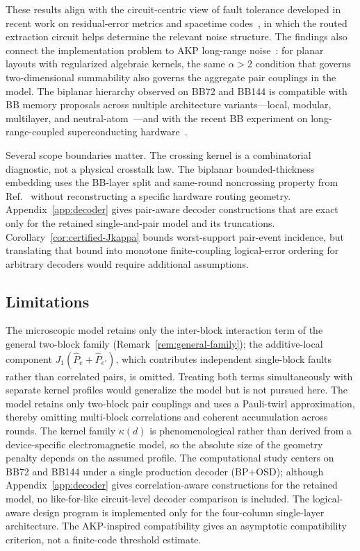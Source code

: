 \documentclass[
aps,
prx,
10pt,
twocolumn,
groupedaddress,
longbibliography,
nofootinbib,
floatfix
]{revtex4-2}
\theoremstyle{definition}
\begin{document}
These results align with the circuit-centric view of fault tolerance developed in recent work on residual-error metrics and spacetime codes~\cite{strikis_sec_2026,aitchison_beri_2025,pesah_spacetime_2025}, in which the routed extraction circuit helps determine the relevant noise structure. The findings also connect the implementation problem to AKP long-range noise~\cite{akp_2006}: for planar layouts with regularized algebraic kernels, the same $\alpha>2$ condition that governs two-dimensional summability also governs the aggregate pair couplings in the model. The biplanar hierarchy observed on BB72 and BB144 is compatible with BB memory proposals across multiple architecture variants---local, modular, multilayer, and neutral-atom~\cite{berthusen_local_2025,shaw_terhal_2025,strikis_berent_2023,mathews_multilayer_2025,liang_openboundaries_2025,wang_mueller_2026,poole_rydberg_2025,zhou_louvre_2025,berthusen_adaptive_2025,he_extractors_2025,yoder_tourdegross_2025}---and with the recent BB experiment on long-range-coupled superconducting hardware~\cite{wang_demo_2025}.

Several scope boundaries matter. The crossing kernel is a combinatorial diagnostic, not a physical crosstalk law. The biplanar bounded-thickness embedding uses the BB-layer split and same-round noncrossing property from Ref.~ without reconstructing a specific hardware routing geometry. Appendix~\ref{app:decoder} gives pair-aware decoder constructions that are exact only for the retained single-and-pair model and its truncations. Corollary~\ref{cor:certified-Jkappa} bounds worst-support pair-event incidence, but translating that bound into monotone finite-coupling logical-error ordering for arbitrary decoders would require additional assumptions.

\subsection{Limitations}

The microscopic model retains only the inter-block interaction term of the general two-block family (Remark~\ref{rem:general-family}); the additive-local component $J_1(\hat P_e+\hat P_{e'})$, which contributes independent single-block faults rather than correlated pairs, is omitted. Treating both terms simultaneously with separate kernel profiles would generalize the model but is not pursued here. The model retains only two-block pair couplings and uses a Pauli-twirl approximation, thereby omitting multi-block correlations and coherent accumulation across rounds. The kernel family $\kappa(d)$ is phenomenological rather than derived from a device-specific electromagnetic model, so the absolute size of the geometry penalty depends on the assumed profile. The computational study centers on BB72 and BB144 under a single production decoder (BP+OSD); although Appendix~\ref{app:decoder} gives correlation-aware constructions for the retained model, no like-for-like circuit-level decoder comparison is included. The logical-aware design program is implemented only for the four-column single-layer architecture. The AKP-inspired compatibility gives an asymptotic compatibility criterion, not a finite-code threshold estimate.
\end{document}
